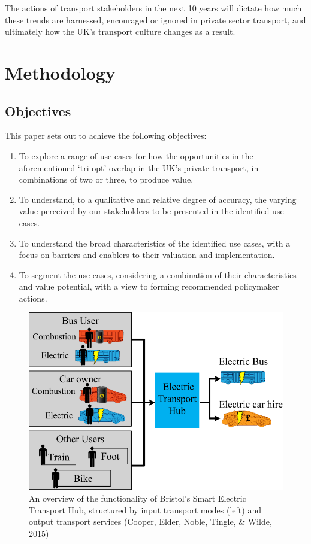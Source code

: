 \documentclass[journal]{IEEEtran}
\begin{document}
The actions of transport stakeholders in the next 10 years will
dictate how much these trends are harnessed, encouraged or ignored in
private sector transport, and ultimately how the UK’s transport
culture changes as a result.


\section{Methodology}\label{methodology}

\subsection{Objectives}

This paper sets out to achieve the following objectives:

\begin{enumerate}
\item To explore a range of use cases for how the opportunities in the
  aforementioned `tri-opt' overlap in the UK's private transport, in
  combinations of two or three, to produce value.  
\item To understand, to a qualitative and relative degree of accuracy,
  the varying value perceived by our stakeholders to be presented in
  the identified use cases. 
\item To understand the broad characteristics of the identified use
  cases, with a focus on barriers and enablers to their valuation and
  implementation.
\item To segment the use cases, considering a combination of their
  characteristics and value potential, with a view to forming
  recommended policymaker actions.
\end{enumerate}

\begin{figure}[!htp]
\centering
\includegraphics[width=\columnwidth]{images/bristolhub.png}
\caption{An overview of the functionality of Bristol's Smart Electric
  Transport Hub, structured by input transport modes (left) and output
  transport services (Cooper, Elder, Noble, Tingle, \& Wilde,
  2015)}
\label{fig:bristolhub}
\end{figure}
\end{document}
